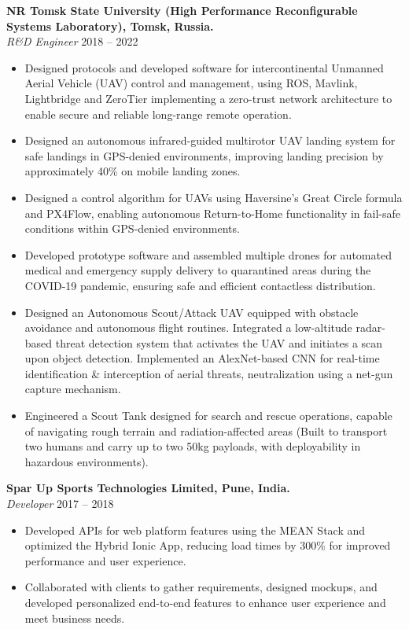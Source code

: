 \textbf{NR Tomsk State University (High Performance Reconfigurable Systems Laboratory), Tomsk, Russia.} \\
\textit{R\&D Engineer} \hfill 2018 – 2022
\begin{itemize}[noitemsep,nolistsep]
    \item Designed protocols and developed software for intercontinental Unmanned Aerial Vehicle (UAV) control and management, using ROS, Mavlink, Lightbridge and ZeroTier implementing a zero-trust network architecture to enable secure and reliable long-range remote operation.
    \item Designed an autonomous infrared-guided multirotor UAV landing system for safe landings in GPS-denied environments, improving landing precision by approximately 40\% on mobile landing zones.
    \item Designed a control algorithm for UAVs using Haversine’s Great Circle formula and PX4Flow, enabling autonomous Return-to-Home functionality in fail-safe conditions within GPS-denied environments.
    \item Developed prototype software and assembled multiple drones for automated medical and emergency supply delivery to quarantined areas during the COVID-19 pandemic, ensuring safe and efficient contactless distribution.
    \item Designed an Autonomous Scout/Attack UAV equipped with obstacle avoidance and autonomous flight routines. Integrated a low-altitude radar-based threat detection system that activates the UAV and initiates a scan upon object detection. Implemented an AlexNet-based CNN for real-time identification \& interception of aerial threats, neutralization using a net-gun capture mechanism.
    \item Engineered a Scout Tank designed for search and rescue operations, capable of navigating rough terrain and radiation-affected areas (Built to transport two humans and carry up to two 50kg payloads, with deployability in hazardous environments).
\end{itemize}

\textbf{Spar Up Sports Technologies Limited, Pune, India.} \\
\textit{Developer} \hfill 2017 – 2018
\begin{itemize}[noitemsep,nolistsep]
    \item Developed APIs for web platform features using the MEAN Stack and optimized the Hybrid Ionic App, reducing load times by 300\% for improved performance and user experience.
    \item Collaborated with clients to gather requirements, designed mockups, and developed personalized end-to-end features to enhance user experience and meet business needs.
\end{itemize}

